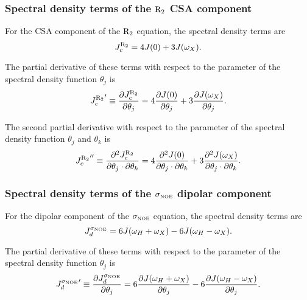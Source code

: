 \subsubsection{Spectral density terms of the $\mathrm{R}_2$ CSA component}

For the CSA component of the $\mathrm{R}_2$ equation, the spectral density terms are
\begin{equation}
    J_c^{\mathrm{R}_2} = 4J(0) + 3J(\omega_X).  \label{eq: J terms: JR2c}
\end{equation}

\noindent The partial derivative of these terms with respect to the parameter of the spectral density function $\theta_j$ is
\begin{equation}
    {J_c^{\mathrm{R}_2}}' \equiv \frac{\partial J_c^{\mathrm{R}_2}}{\partial \theta_j}
        = 4 \frac{\partial J(0)}{\partial \theta_j}
        + 3 \frac{\partial J(\omega_X)}{\partial \theta_j}.  \label{eq: J terms: JR2c'}
\end{equation}

\noindent The second partial derivative with respect to the parameter of the spectral density function $\theta_j$ and $\theta_k$ is
\begin{equation}
    {J_c^{\mathrm{R}_2}}'' \equiv \frac{\partial^2 J_c^{\mathrm{R}_2}}{\partial \theta_j \cdot \partial \theta_k}
        = 4 \frac{\partial^2 J(0)}{\partial \theta_j \cdot \partial \theta_k}
        + 3 \frac{\partial^2 J(\omega_X)}{\partial \theta_j \cdot \partial \theta_k}.  \label{eq: J terms: JR2c"}
\end{equation}


\subsubsection{Spectral density terms of the $\sigma_{\scriptscriptstyle \mathrm{NOE}}$ dipolar component}

For the dipolar component of the $\sigma_{\scriptscriptstyle \mathrm{NOE}}$ equation, the spectral density terms are
\begin{equation}
    J_d^{\sigma_{\scriptscriptstyle \mathrm{NOE}}} = 6J(\omega_H + \omega_X) - 6J(\omega_H - \omega_X).  \label{eq: J terms: JsigmaNOEd}
\end{equation}

\noindent The partial derivative of these terms with respect to the parameter of the spectral density function $\theta_j$ is
\begin{equation}
    {J_d^{\sigma_{\scriptscriptstyle \mathrm{NOE}}}}' \equiv \frac{\partial J_d^{\sigma_{\scriptscriptstyle \mathrm{NOE}}}}{\partial \theta_j}
        = 6 \frac{\partial J(\omega_H + \omega_X)}{\partial \theta_j}
        - 6 \frac{\partial J(\omega_H - \omega_X)}{\partial \theta_j}.  \label{eq: J terms: JsigmaNOEd'}
\end{equation}

